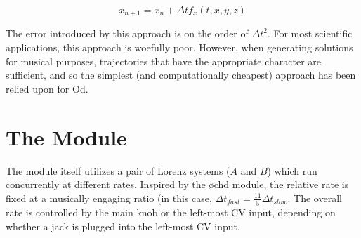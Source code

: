 \documentclass{tufte-handout}
\begin{document}
$$x_{n+1} = x_n + \Delta t f_{x}(t, x, y, z)$$

The error introduced by this approach is on the order of ${\Delta t}^2$. For most scientific applications, this approach is woefully poor. However, when generating solutions for musical purposes, trajectories that have the appropriate character are sufficient, and so the simplest (and computationally cheapest) approach has been relied upon for Od.

\section{The Module}\label{sec:the_module}

The module itself utilizes a pair of Lorenz systems ($A$ and $B$) which run concurrently at different rates. Inspired by the \o chd module, the relative rate is fixed at a musically engaging ratio (in this case, $\Delta t_{fast} = \frac{11}{5} \Delta t_{slow}$. The overall rate is controlled by the main knob or the left-most CV input, depending on whether a jack is plugged into the left-most CV input.
\end{document}
